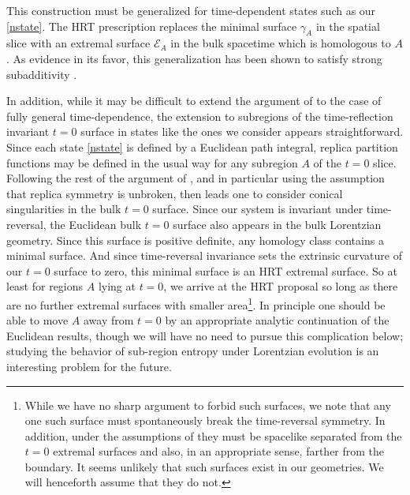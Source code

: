 \documentclass[12pt]{article}
\numberwithin{equation}{section}
\begin{document}
This construction must be generalized for time-dependent states such as our \eqref{nstate}.  The HRT prescription \cite{Hubeny:2007xt} replaces the minimal surface $\gamma_A$ in the spatial slice with an extremal surface $\mathcal E_A$ in the bulk spacetime which is homologous to $A$.  As evidence in its favor, this generalization has been shown to satisfy strong subadditivity \cite{Wall:2012uf}.

In addition, while it may be difficult to extend the argument of \cite{Lewkowycz:2013nqa} to the case of fully general time-dependence, the extension to subregions of the time-reflection invariant $t=0$ surface in states like the ones we consider
appears straightforward.  Since each state \eqref{nstate} is defined by a Euclidean path integral, replica partition functions may be defined in the usual way for any subregion $A$ of the $t=0$ slice.  Following the rest of the argument of \cite{Lewkowycz:2013nqa}, and in particular using the assumption that replica symmetry is unbroken, then leads one to consider conical singularities in the bulk $t=0$ surface.  Since our system is invariant under time-reversal, the Euclidean bulk $t=0$ surface also appears in the bulk Lorentzian geometry.  Since this surface is positive definite, any homology class contains a minimal surface.  And since time-reversal invariance sets the extrinsic curvature of our $t=0$ surface to zero, this minimal surface is an HRT extremal surface.  So at least for regions $A$ lying at $t=0$, we arrive at the HRT proposal so long as there are no further extremal surfaces with smaller area\footnote{While we have no sharp argument to forbid such surfaces, we note that any one such surface must spontaneously break the time-reversal symmetry.  In addition, under the assumptions of \cite{Wall:2012uf} they must be spacelike separated from the $t=0$ extremal surfaces and also, in an appropriate sense, farther from the boundary.  It seems unlikely that such surfaces exist in our geometries. We will henceforth assume that they do not.}.  In principle one should be able to move $A$ away from $t=0$ by an appropriate analytic continuation of the Euclidean results, though we will have no need to pursue this complication below; studying the behavior of sub-region entropy under Lorentzian evolution is an interesting problem for the future.
\end{document}
